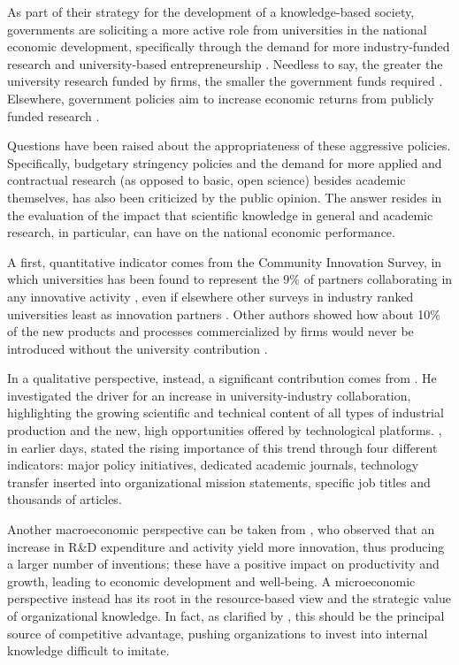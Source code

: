 As part of their strategy for the development of a knowledge-based society, governments are soliciting a more active role from universities in the national economic development, specifically through the demand for more industry-funded research \citep{Geuna2009} and university-based entrepreneurship \citep{OShea2004}. Needless to say, the greater the university research funded by firms, the smaller the government funds required \citep{Yusuf2008}. Elsewhere, government policies aim to increase economic returns from publicly funded research \citep{Bercovitz2006}.

Questions have been raised about the appropriateness of these aggressive policies. Specifically, budgetary stringency policies and the demand for more applied and contractual research (as opposed to basic, open science) besides academic themselves, has also been criticized by the public opinion. The answer resides in the evaluation of the impact that scientific knowledge in general and academic research, in particular, can have on the national economic performance.

A first, quantitative indicator comes from the Community Innovation Survey, in which universities has been found to represent the 9\% of partners collaborating in any innovative activity \citep{Muscio2008}, even if elsewhere other surveys in industry ranked universities least as innovation partners \citep{Yusuf2008}. Other authors showed how about 10\% of the new products and processes commercialized by firms would never be introduced without the university contribution \citep{Bekkers2008}. 

In a qualitative perspective, instead, a significant contribution comes from \citet{Bercovitz2006}. He investigated the driver for an increase in university-industry collaboration, highlighting the growing scientific and technical content of all types of industrial production and the new, high opportunities offered by technological platforms. \citet{Bozeman2000}, in earlier days, stated the rising importance of this trend through four different indicators: major policy initiatives, dedicated academic journals, technology transfer inserted into organizational mission statements, specific job titles and thousands of articles. 

Another macroeconomic perspective can be taken from \citet{Markman2005}, who observed that an increase in R\&D expenditure and activity yield more innovation, thus producing a larger number of inventions; these have a positive impact on productivity and growth, leading to economic development and well-being. A microeconomic perspective instead has its root in the resource-based view \citep{Wernerfelt1984} and the strategic value of organizational knowledge. In fact, as clarified by \citet{Argote2000}, this should be the principal source of competitive advantage, pushing organizations to invest into internal knowledge difficult to imitate.

